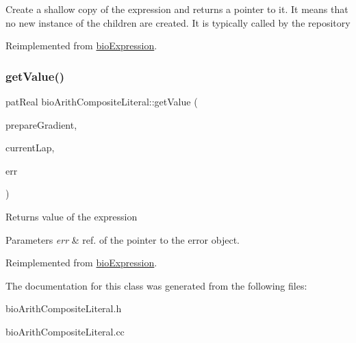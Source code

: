 Create a shallow copy of the expression and returns a pointer to it. It means that no new instance of the children are created. It is typically called by the repository 

Reimplemented from \hyperlink{classbio_expression_a442534762693b92baaf33928979a1bf8}{bio\+Expression}.

\mbox{\label{classbio_arith_composite_literal_ab0471105a849e772c1e93f5b45b66acb}} 
\subsubsection{\texorpdfstring{get\+Value()}{getValue()}}
{\footnotesize\ttfamily pat\+Real bio\+Arith\+Composite\+Literal\+::get\+Value (\begin{DoxyParamCaption}\item[{pat\+Boolean}]{prepare\+Gradient,  }\item[{pat\+U\+Long}]{current\+Lap,  }\item[{pat\+Error $\ast$\&}]{err }\end{DoxyParamCaption})\hspace{0.3cm}{\ttfamily [virtual]}}

\begin{DoxyReturn}{Returns}
value of the expression 
\end{DoxyReturn}

\begin{DoxyParams}{Parameters}
{\em err} & ref. of the pointer to the error object. \\
\hline
\end{DoxyParams}


Reimplemented from \hyperlink{classbio_expression_af58662a5d4d456f15bc4f2c9bd4f8a5b}{bio\+Expression}.



The documentation for this class was generated from the following files\+:\begin{DoxyCompactItemize}
\item 
bio\+Arith\+Composite\+Literal.\+h\item 
bio\+Arith\+Composite\+Literal.\+cc\end{DoxyCompactItemize}
